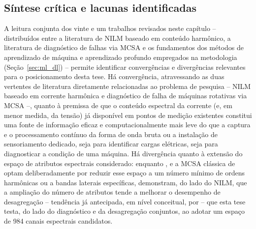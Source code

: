 \documentclass[times,final]{elsarticle}
\begin{document}
\subsection{Síntese crítica e lacunas identificadas}
\label{sec:sintese}
A leitura conjunta dos vinte e um trabalhos revisados neste capítulo -- distribuídos entre a literatura de NILM baseado em conteúdo harmônico, a literatura de diagnóstico de falhas via MCSA e os fundamentos dos métodos de aprendizado de máquina e aprendizado profundo empregados na metodologia (Seção~\ref{sec:ml_dl}) -- permite identificar convergências e divergências relevantes para o posicionamento desta tese. Há convergência, atravessando as duas vertentes de literatura diretamente relacionadas ao problema de pesquisa -- NILM baseado em corrente harmônica \citep{hart1992,zeifman2011,djordjevic2017,bouhouras2017,li2019moea} e diagnóstico de falha de máquinas rotativas via MCSA \citep{nandi2005,thomson2001,niu2023,benamira2022,martinez2022} --, quanto à premissa de que o conteúdo espectral da corrente (e, em menor medida, da tensão) já disponível em pontos de medição existentes constitui uma fonte de informação eficaz e computacionalmente mais leve do que a captura e o processamento contínuo da forma de onda bruta ou a instalação de sensoriamento dedicado, seja para identificar cargas elétricas, seja para diagnosticar a condição de uma máquina. Há divergência quanto à extensão do espaço de atributos espectrais considerado: enquanto \citet{djordjevic2017}, \citet{bouhouras2017} e a MCSA clássica de \citet{thomson2001} optam deliberadamente por reduzir esse espaço a um número mínimo de ordens harmônicas ou a bandas laterais específicas, \citet{li2019moea} demonstram, do lado do NILM, que a ampliação do número de atributos tende a melhorar o desempenho de desagregação -- tendência já antecipada, em nível conceitual, por \citet{zeifman2011} -- que esta tese testa, do lado do diagnóstico e da desagregação conjuntos, ao adotar um espaço de 984 canais espectrais candidatos.
\end{document}
